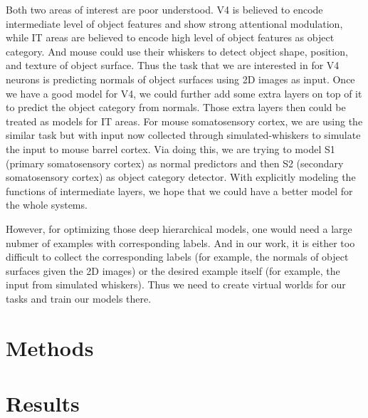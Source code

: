 \documentclass[12pt]{article}
\begin{document}
Both two areas of interest are poor understood. V4 is believed to encode intermediate level of object features and show strong attentional modulation\cite{Roe2012}, while IT areas are believed to encode high level of object features as object category. And mouse could use their whiskers to detect object shape, position, and texture of object surface\cite{Boubenec2012,Diamond2008,Arabzadeh2005,OConnor2010}. Thus the task that we are interested in for V4 neurons is predicting normals of object surfaces using 2D images as input. Once we have a good model for V4, we could further add some extra layers on top of it to predict the object category from normals. Those extra layers then could be treated as models for IT areas. For mouse somatosensory cortex, we are using the similar task but with input now collected through simulated-whiskers to simulate the input to mouse barrel cortex. Via doing this, we are trying to model S1 (primary somatosensory cortex) as normal predictors and then S2 (secondary somatosensory cortex) as object category detector. With explicitly modeling the functions of intermediate layers, we hope that we could have a better model for the whole systems.

However, for optimizing those deep hierarchical models, one would need a large nubmer of examples with corresponding labels. And in our work, it is either too difficult to collect the corresponding labels (for example, the normals of object surfaces given the 2D images) or the desired example itself (for example, the input from simulated whiskers). Thus we need to create virtual worlds for our tasks and train our models there.

\section*{Methods}



\section*{Results}



%
%

\end{document}
